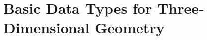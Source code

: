 \chapter{Basic Data Types for Three-Dimensional Geometry}
\label{Basic Data Types for Three-Dimensional Geometry}
\newpage


\newpage

\newpage

\newpage

\newpage

\newpage

\newpage

\newpage


\newpage

\newpage

\newpage

\newpage

\newpage

\newpage

\newpage


\newpage

\newpage

